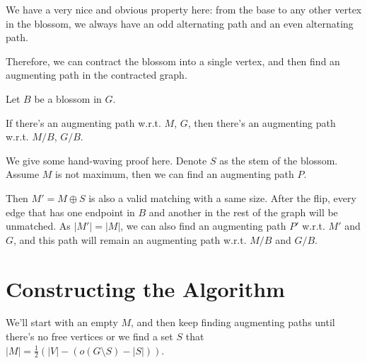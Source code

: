 \begin{center}
\end{center}

We have a very nice and obvious property here: from the base to any other vertex in the blossom, we always have an odd alternating path and an even alternating path.

Therefore, we can contract the blossom into a single vertex, and then find an augmenting path in the contracted graph.

\begin{theorem}
	Let $B$ be a blossom in $G$.

	If there's an augmenting path w.r.t. $M$, $G$, then there's an augmenting path w.r.t. $M/B$, $G/B$.
\end{theorem}
We give some hand-waving proof here.
Denote $S$ as the stem of the blossom.
Assume $M$ is not maximum, then we can find an augmenting path $P$.

Then $M' = M\oplus S$ is also a valid matching with a same size. After the flip, every edge that has one endpoint in $B$ and another in the rest of the graph will be unmatched.
As $|M'| = |M|$, we can also find an augmenting path $P'$ w.r.t. $M'$ and $G$, and this path will remain an augmenting path w.r.t. $M/B$ and $G/B$.

\section{Constructing the Algorithm}

We'll start with an empty $M$, and then keep finding augmenting paths until there's no free vertices or we find a set $S$ that $|M| = \frac{1}{2}(|V| - (o(G\setminus S)-|S|))$.

